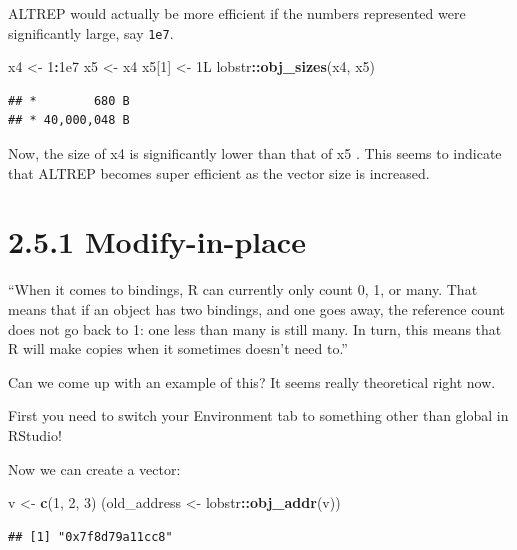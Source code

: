 \documentclass[]{book}
\newenvironment{Shaded}{\begin{snugshade}}{\end{snugshade}}
\newcommand{\DecValTok}[1]{\textcolor[rgb]{0.00,0.00,0.81}{#1}}
\newcommand{\FloatTok}[1]{\textcolor[rgb]{0.00,0.00,0.81}{#1}}
\newcommand{\KeywordTok}[1]{\textcolor[rgb]{0.13,0.29,0.53}{\textbf{#1}}}
\newcommand{\NormalTok}[1]{#1}
\newcommand{\OperatorTok}[1]{\textcolor[rgb]{0.81,0.36,0.00}{\textbf{#1}}}
\newcommand{\StringTok}[1]{\textcolor[rgb]{0.31,0.60,0.02}{#1}}
\begin{document}
ALTREP would actually be more efficient if the numbers represented were significantly large, say \texttt{1e7}.

\begin{Shaded}
\begin{Highlighting}[]
\NormalTok{x4 <-}\StringTok{ }\DecValTok{1}\OperatorTok{:}\FloatTok{1e7}
\NormalTok{x5 <-}\StringTok{ }\NormalTok{x4}
\NormalTok{x5[}\DecValTok{1}\NormalTok{] <-}\StringTok{ }\NormalTok{1L}
\NormalTok{lobstr}\OperatorTok{::}\KeywordTok{obj_sizes}\NormalTok{(x4, x5)}
\end{Highlighting}
\end{Shaded}

\begin{verbatim}
## *        680 B
## * 40,000,048 B
\end{verbatim}

Now, the size of x4 is significantly lower than that of x5 . This seems to indicate that ALTREP becomes super efficient as the vector size is increased.

\hypertarget{modify-in-place}{%
\section*{2.5.1 Modify-in-place}\label{modify-in-place}}

``When it comes to bindings, R can currently only count 0, 1, or many. That means that if an object has two bindings, and one goes away, the reference count does not go back to 1: one less than many is still many. In turn, this means that R will make copies when it sometimes doesn't need to.''

Can we come up with an example of this? It seems really theoretical right now.

First you need to switch your Environment tab to something other than global in RStudio!

Now we can create a vector:

\begin{Shaded}
\begin{Highlighting}[]
\NormalTok{v <-}\StringTok{ }\KeywordTok{c}\NormalTok{(}\DecValTok{1}\NormalTok{, }\DecValTok{2}\NormalTok{, }\DecValTok{3}\NormalTok{)}
\NormalTok{(old_address <-}\StringTok{ }\NormalTok{lobstr}\OperatorTok{::}\KeywordTok{obj_addr}\NormalTok{(v))}
\end{Highlighting}
\end{Shaded}

\begin{verbatim}
## [1] "0x7f8d79a11cc8"
\end{verbatim}
\end{document}
